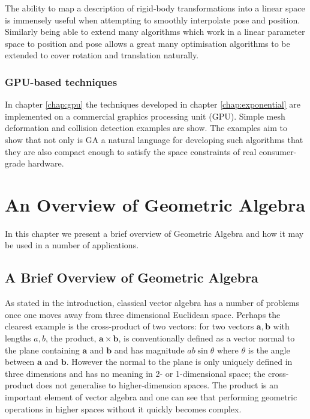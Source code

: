 The ability to map a description of rigid-body transformations into a linear space
is immensely useful when attempting to smoothly interpolate pose and position. Similarly
being able to extend many algorithms which work in a linear parameter space to position and
pose allows a great many optimisation algorithms to be extended to cover rotation and
translation naturally.

\subsection{GPU-based techniques}

In chapter \ref{chap:gpu} the techniques developed in chapter \ref{chap:exponential}
are implemented on a commercial graphics processing unit (GPU).  Simple mesh
deformation and collision detection examples are show.  The examples aim to
show that not only is GA a natural language for developing such algorithms that
they are also compact enough to satisfy the space constraints of real
consumer-grade hardware.

\begin{savequote}
\end{savequote}

\chapter{An Overview of Geometric Algebra}
\label{chap:introduction}

In this chapter we present a brief overview of Geometric Algebra and how it may
be used in a number of applications.

\section{A Brief Overview of Geometric Algebra}

As stated in the introduction, classical vector algebra has a number of problems once one
moves away from three dimensional Euclidean space. Perhaps the clearest
example is the cross-product of two vectors: for two
vectors $\mathbf{a}, \mathbf{b}$ with lengths $a, b$, the product, $\mathbf{a} \times
\mathbf{b}$, is conventionally defined as a vector normal to the plane
containing $\mathbf{a}$ and $\mathbf{b}$ and has magnitude $ab\sin\theta$
where $\theta$ is the angle between $\mathbf{a}$ and $\mathbf{b}$. However the
normal to the plane is only uniquely defined in three dimensions and has no
meaning in 2- or 1-dimensional space; the cross-product does not generalise to
higher-dimension spaces. The product is an important element of vector algebra
and one can see that performing geometric operations in higher spaces without
it quickly becomes complex.

